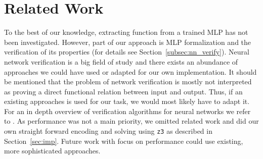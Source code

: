 \section{Related Work}
    \label{sec:rel}
    To the best of our knowledge, extracting function from a trained MLP has not been investigated. However, part of our approach is MLP formalization and the verification of its properties (for details see Section~\ref{subsec:nn_verify}). Neural network verification is a big field of study and there exists an abundance of approaches we could have used or adapted for our own implementation. It should be mentioned that the problem of network verification is mostly not interpreted as proving a direct functional relation between input and output. Thus, if an existing approaches is used for our task, we would most likely have to adapt it. For an in depth overview of verification algorithms for neural networks we refer to \cite{liu2019algorithms}. As performance was not a main priority, we omitted related work and did our own straight forward encoding and solving using \lstinline{z3} as described in Section~\ref{sec:imp}. Future work with focus on performance could use existing, more sophisticated approaches.

